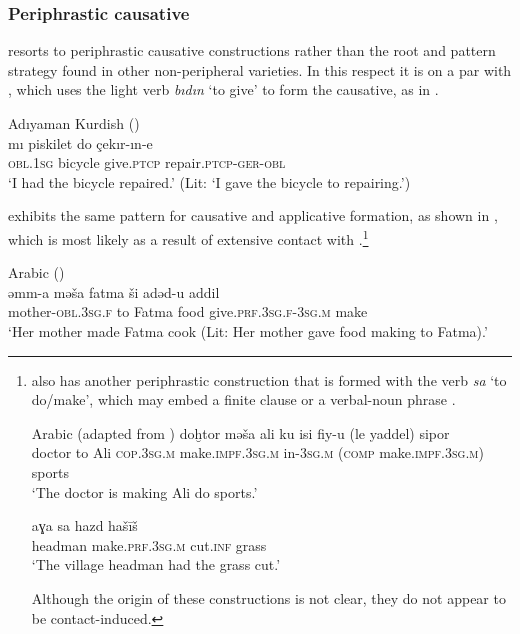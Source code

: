 \documentclass[output=paper]{langsci/langscibook}
\begin{document}
\subsubsection{Periphrastic causative}

  resorts to {periphrastic causative} constructions rather than the {root and pattern} strategy found in other non-peripheral  varieties. In this respect it is on a par with , which uses the {light verb} \textit{bıdın} ‘to give’ to form the {causative}, as in .

\begin{exe}
\ex \label{perrk}
{Adıyaman  Kurdish} (\citealt[62]{Atlamaz2012})\\
\gll  	mı         piskilet      	   do      	çekır-ın-e	\\
        \textsc{obl.1sg} bicycle  give.\textsc{ptcp}   repair.\textsc{ptcp-ger-obl}	 \\
        \glt `I had the bicycle repaired.' (Lit: `I gave the bicycle to repairing.')
\end{exe}

  exhibits the same pattern for {causative} and applicative {formation}, as shown in , which is most likely as a result of extensive contact with .\footnote{  also has another periphrastic construction that is formed with the verb \textit{sa} `to do/make', which may embed a finite clause  or a verbal-{noun phrase} .

\ea \label{make} { Arabic} (adapted from \citealt[221]{Taylan2017})
\ea
\label{makefin}  \gll doḫtor mə\v{s}a ali ku isi fiy-u (le yaddel) sipor \\
		doctor to Ali \textsc{cop.3sg.m} make.\textsc{impf.3sg.m} in-\textsc{3sg.m} (\textsc{comp} make.\textsc{impf.3sg.m}) sports\\\glt `The doctor is making Ali do sports.'

		\ex \label{makeinf} \gll aɣa sa hazd ha\v{s}ī\v{s}\\
		headman make.\textsc{prf.3sg.m} cut.\textsc{inf} grass  \\
		\glt 	`The village headman had the grass cut.'
\z
\z

\noindent Although the origin of these constructions is not clear, they do not appear to be contact-induced.}

\begin{exe}
\ex \label{persa}
 Arabic (\citealt[221]{Taylan2017})\\
\gll  	əmm-a mə\v{s}a fatma \v{s}i adəd-u    	addil	\\
  mother-\textsc{obl.3sg.f} to Fatma food      give.\textsc{prf.3sg.f-3sg.m}	make	 \\
        \glt `Her mother made Fatma cook (Lit: Her mother gave food making to Fatma).'
\end{exe}
\end{document}
